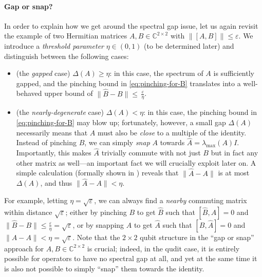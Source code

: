 \documentclass[11pt]{article}
\theoremstyle{plain}
\newcommand{\eps}{\varepsilon}
\newcommand{\AlexNote}[1]{\textcolor{purple}{(Alex: #1)}}
\newcommand{\AlexNote}[1]{}
\begin{document}
\paragraph{Gap or snap?} In order to explain how we get around the spectral gap issue, let us again revisit the example of two Hermitian matrices $A,B \in \mathbb{C}^{2 \times 2}$ with $\|[A,B]\| \leq \eps$. We introduce a \emph{threshold parameter} $\eta \in (0,1)$ (to be determined later) and distinguish between the following cases:
\begin{itemize}
    \item (the \emph{gapped} case) $\Delta(A) \geq \eta$: in this case, the spectrum of $A$ is sufficiently gapped, and the pinching bound in \eqref{eq:pinching-for-B} translates into a well-behaved upper bound of $\|\hat{B} - B\| \leq  \, \frac{\eps}{\eta}$.

    \item (the \emph{nearly-degenerate} case) $\Delta(A) < \eta$: in this case, the pinching bound in \eqref{eq:pinching-for-B} may blow up; fortunately, however, a small gap $\Delta(A)$ necessarily means that $A$ must also be \emph{close} to a multiple of the identity. Instead of pinching $B$, we can simply \emph{snap} $A$ towards $\hat{A} = \lambda_{\max}(A) I$. Importantly, this makes $\hat{A}$ trivially commute with not just $B$ but in fact any other matrix as well---an important fact we will crucially exploit later on.
    A simple calculation (formally shown in ) reveals that $\|\hat{A} - A\|$ is at most $\Delta(A)$, and thus $\|\hat{A} - A\| < \eta$.
\end{itemize}
For example, letting $\eta = \sqrt{\eps}$, we can always find a \emph{nearby} commuting matrix within distance $\sqrt{\eps}$; either by pinching $B$ to get $\hat B$ such that $[\hat{B},A]=0$ and $\|\hat{B} - B\| \leq \frac{\eps}{\eta} = \sqrt{\eps}$, or by snapping $A$ to get $\hat{A}$ such that $[B,\hat{A}]=0$ and $\|\hat{A} - A\| < \eta = \sqrt{\eps}$.
Note that the $2 \times 2$ qubit structure in the ``gap or snap'' approach for $A,B \in \mathbb{C}^{2 \times 2}$ is crucial; indeed, in the qudit case, it is entirely possible for operators to have no spectral gap at all, and yet at the same time it is also not possible to simply ``snap'' them towards the identity. %
\end{document}
